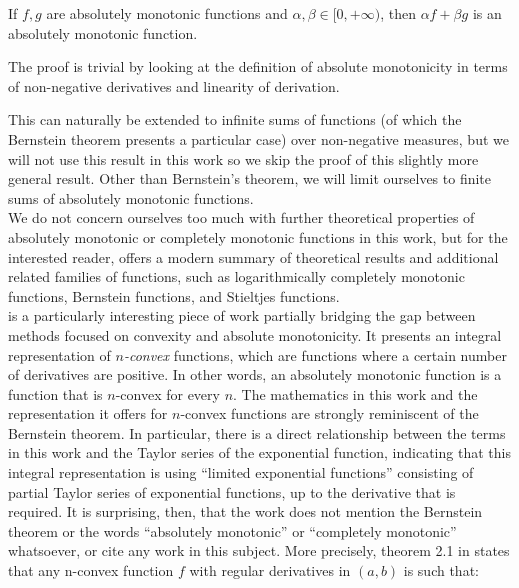\documentclass[12pt,a4paper]{article}
\begin{document}
\begin{lemma}
If $f, g$ are absolutely monotonic functions and $\alpha, \beta \in [0,+\infty)$, then $\alpha f + \beta g$ is an absolutely monotonic function.
\end{lemma}

The proof is trivial by looking at the definition of absolute monotonicity in terms of non-negative derivatives and linearity of derivation.

This can naturally be extended to infinite sums of functions (of which the Bernstein theorem presents a particular case) over non-negative measures, but we will not use this result in this work so we skip the proof of this slightly more general result. Other than Bernstein's theorem, we will limit ourselves to finite sums of absolutely monotonic functions.\\

We do not concern ourselves too much with further theoretical properties of absolutely monotonic or completely monotonic functions in this work, but for the interested reader, \cite{2014_koumandos_completely_monotonic} offers a modern summary of theoretical results and additional related families of functions, such as logarithmically completely monotonic functions, Bernstein functions, and Stieltjes functions.\\

\cite{2011_rajba_integral_representation_convex_functions} is a particularly interesting piece of work partially bridging the gap between methods focused on convexity and absolute monotonicity. It presents an integral representation of {\emph{$n$-convex}} functions, which are functions where a certain number of derivatives are positive. In other words, an absolutely monotonic function is a function that is $n$-convex for every $n$. The mathematics in this work and the representation it offers for $n$-convex functions are strongly reminiscent of the Bernstein theorem. In particular, there is a direct relationship between the terms in this work and the Taylor series of the exponential function, indicating that this integral representation is using ``limited exponential functions'' consisting of partial Taylor series of exponential functions, up to the derivative that is required. It is surprising, then, that the work does not mention the Bernstein theorem or the words ``absolutely monotonic'' or ``completely monotonic'' whatsoever, or cite any work in this subject. More precisely, theorem 2.1 in \cite{2011_rajba_integral_representation_convex_functions} states that any n-convex function $f$ with regular derivatives in $(a,b)$ is such that:
\end{document}
